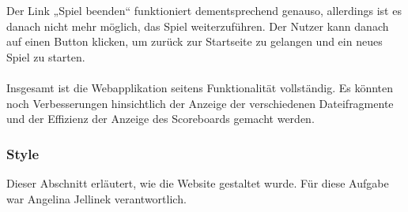 Der Link „Spiel beenden“ funktioniert dementsprechend genauso, allerdings ist es danach nicht mehr möglich, das Spiel weiterzuführen. Der Nutzer kann danach auf einen Button klicken, um zurück zur Startseite zu gelangen und ein neues Spiel zu starten.\\\\
Insgesamt ist die Webapplikation seitens Funktionalität vollständig. Es könnten noch Verbesserungen hinsichtlich der Anzeige der verschiedenen Dateifragmente und der Effizienz der Anzeige des Scoreboards gemacht werden.


\subsubsection{Style}
\label{sec:services-style}


Dieser Abschnitt erläutert, wie die Website gestaltet wurde. Für diese Aufgabe war Angelina Jellinek verantwortlich.

